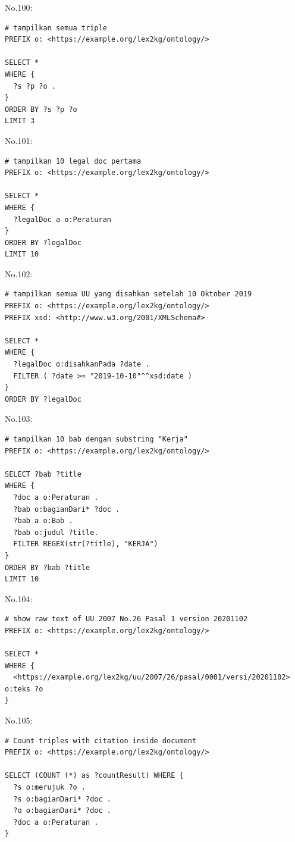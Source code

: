 \noindent No.100:
\begin{lstlisting}
# tampilkan semua triple
PREFIX o: <https://example.org/lex2kg/ontology/>

SELECT * 
WHERE {
  ?s ?p ?o .
} 
ORDER BY ?s ?p ?o
LIMIT 3
\end{lstlisting}


\noindent No.101:
\begin{lstlisting}
# tampilkan 10 legal doc pertama
PREFIX o: <https://example.org/lex2kg/ontology/>

SELECT * 
WHERE {
  ?legalDoc a o:Peraturan
} 
ORDER BY ?legalDoc
LIMIT 10
\end{lstlisting}


\noindent No.102:
\begin{lstlisting}
# tampilkan semua UU yang disahkan setelah 10 Oktober 2019
PREFIX o: <https://example.org/lex2kg/ontology/>
PREFIX xsd: <http://www.w3.org/2001/XMLSchema#>

SELECT *
WHERE {
  ?legalDoc o:disahkanPada ?date .
  FILTER ( ?date >= "2019-10-10"^^xsd:date )
}
ORDER BY ?legalDoc

\end{lstlisting}


\noindent No.103:
\begin{lstlisting}
# tampilkan 10 bab dengan substring "Kerja"
PREFIX o: <https://example.org/lex2kg/ontology/>

SELECT ?bab ?title
WHERE {
  ?doc a o:Peraturan .
  ?bab o:bagianDari* ?doc .
  ?bab a o:Bab .
  ?bab o:judul ?title.
  FILTER REGEX(str(?title), "KERJA")
}
ORDER BY ?bab ?title
LIMIT 10

\end{lstlisting}


\noindent No.104:
\begin{lstlisting}
# show raw text of UU 2007 No.26 Pasal 1 version 20201102
PREFIX o: <https://example.org/lex2kg/ontology/>

SELECT *
WHERE {
  <https://example.org/lex2kg/uu/2007/26/pasal/0001/versi/20201102> o:teks ?o
}
\end{lstlisting}


\noindent No.105:
\begin{lstlisting}
# Count triples with citation inside document
PREFIX o: <https://example.org/lex2kg/ontology/>

SELECT (COUNT (*) as ?countResult) WHERE {
  ?s o:merujuk ?o .
  ?s o:bagianDari* ?doc .
  ?o o:bagianDari* ?doc .
  ?doc a o:Peraturan .
} 


\end{lstlisting}


